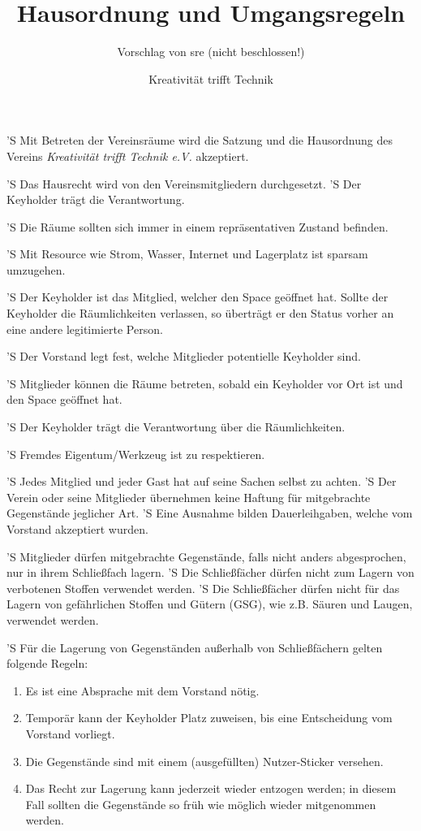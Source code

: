 \documentclass[a4paper,10pt]{scrreprt}
\begin{document}
\title{Hausordnung und Umgangsregeln}
\subtitle{Vorschlag von sre (nicht beschlossen!)}
\author{Kreativität trifft Technik}



\begin{contract}


'S Mit Betreten der Vereinsräume wird die Satzung und die Hausordnung des
Vereins \textit{Kreativität trifft Technik e.V.} akzeptiert.

'S Das Hausrecht wird von den Vereinsmitgliedern durchgesetzt.
'S Der Keyholder trägt die Verantwortung.

'S Die Räume sollten sich immer in einem repräsentativen Zustand befinden.

'S Mit Resource wie Strom, Wasser, Internet und Lagerplatz ist sparsam umzugehen.


'S Der Keyholder ist das Mitglied, welcher den Space geöffnet hat. Sollte der
Keyholder die Räumlichkeiten verlassen, so überträgt er den Status vorher an
eine andere legitimierte Person.

'S Der Vorstand legt fest, welche Mitglieder potentielle Keyholder sind.

'S Mitglieder können die Räume betreten, sobald ein Keyholder vor Ort ist
und den Space geöffnet hat.

'S Der Keyholder trägt die Verantwortung über die Räumlichkeiten.


'S Fremdes Eigentum/Werkzeug ist zu respektieren.

'S Jedes Mitglied und jeder Gast hat auf seine Sachen selbst zu achten.
'S Der Verein oder seine Mitglieder übernehmen keine Haftung für mitgebrachte
Gegenstände jeglicher Art.
'S Eine Ausnahme bilden Dauerleihgaben, welche vom Vorstand akzeptiert wurden.

'S Mitglieder dürfen mitgebrachte Gegenstände, falls nicht anders abgesprochen,
nur in ihrem Schließfach lagern.
'S Die Schließfächer dürfen nicht zum Lagern von verbotenen Stoffen verwendet
werden.
'S Die Schließfächer dürfen nicht für das Lagern von gefährlichen Stoffen und
Gütern (GSG), wie z.B. Säuren und Laugen, verwendet werden.

'S Für die Lagerung von Gegenständen außerhalb von Schließfächern gelten folgende
Regeln:
\begin{enumerate}
	\item Es ist eine Absprache mit dem Vorstand nötig.
	\item Temporär kann der Keyholder Platz zuweisen, bis eine Entscheidung
	vom Vorstand vorliegt.
	\item Die Gegenstände sind mit einem (ausgefüllten) Nutzer-Sticker versehen.
	\item Das Recht zur Lagerung kann jederzeit wieder entzogen werden; in diesem
	Fall sollten die Gegenstände so früh wie möglich wieder mitgenommen werden.
\end{enumerate}


\end{contract}
\end{document}
